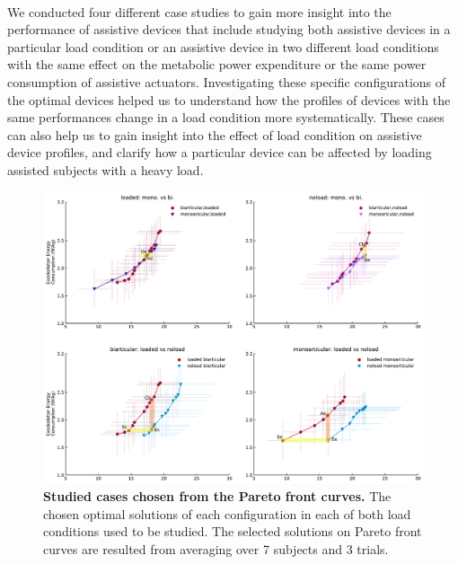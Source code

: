 \documentclass[10pt,letterpaper]{article}
\begin{document}
\vspace*{0.2in}
	
{\Large\textbf{} %
}
\\
\vspace{5 mm}
We conducted four different case studies to gain more insight into the performance of assistive devices that include studying both assistive devices in a particular load condition or an assistive device in two different load conditions with the same effect on the metabolic power expenditure or the same power consumption of assistive actuators. Investigating these specific configurations of the optimal devices helped us to understand how the profiles of devices with the same performances change in a load condition more systematically. These cases can also help us to gain insight into the effect of load condition on assistive device profiles, and clarify how a particular device can be affected by loading assisted subjects with a heavy load.
\begin{figure}[!ht]   
	\centering
	\includegraphics[width=\linewidth]{Case_Studies/PaperFigure_Selected_Configurations.pdf}
	\vspace{1mm}
	\caption{{\small\textbf{Studied cases chosen from the Pareto front curves.} The chosen optimal solutions of each configuration in each of both load conditions used to be studied. The selected solutions on Pareto front curves are resulted from averaging over 7 subjects and 3 trials.}}
	\label{Fig_Selected_OptimalDevices_On_Pareto}
\end{figure}
\end{document}
